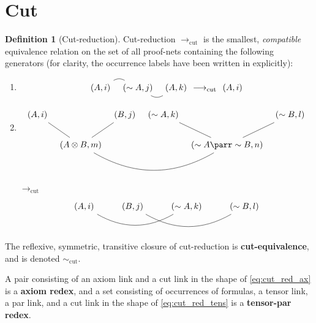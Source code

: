 \documentclass[12pt]{article}
\theoremstyle{plain}
\theoremstyle{definition}
\newtheorem{defn}[thm]{Definition} %
\newcommand{\lto}{\longrightarrow}
\newcommand{\negation}{\sim}
\begin{document}
\section{Cut}
\begin{defn}[Cut-reduction]
Cut-reduction $\lto_{\operatorname{cut}}$ is the smallest, \emph{compatible} equivalence relation on the set of all proof-nets containing the following generators (for clarity, the occurrence labels have been written in explicitly):
\begin{enumerate}
    \item \begin{equation}\label{eq:cut_red_ax}
    \begin{tikzcd}[column sep = tiny]
        (A,i)\arrow[r,dash, bend left] & (\negation A,j)\arrow[r,dash, bend right] & (A,k)
    \end{tikzcd}
    \lto_{\operatorname{cut}}
    \begin{tikzcd}
        (A,i)
    \end{tikzcd}
\end{equation}
    \item \begin{equation}\label{eq:cut_red_tens}
        \begin{tikzcd}[column sep = tiny]
            (A,i)\arrow[dr,dash] && (B,j)\arrow[dl,dash] & (\negation A, k)\arrow[dr,dash] && (\negation B, l)\arrow[dl,dash]\\
            & (A \otimes B, m)\arrow[rrr,dash, bend right] & & & (\negation A \parr \negation B, n)
        \end{tikzcd}
    \end{equation}
    $\lto_{\operatorname{cut}}$
    \begin{equation}
    \begin{tikzcd}
        (A,i)\arrow[rr,dash,bend right] & (B,j)\arrow[rr,dash,bend right] & (\negation A, k) & (\negation B, l)
        \end{tikzcd}
    \end{equation}
\end{enumerate}
The reflexive, symmetric, transitive closure of cut-reduction is \textbf{cut-equivalence}, and is denoted $\sim_{\operatorname{cut}}$.

A pair consisting of an axiom link and a cut link in the shape of \eqref{eq:cut_red_ax} is a \textbf{axiom redex}, and a set consisting of occurrences of formulas, a tensor link, a par link, and a cut link in the shape of \eqref{eq:cut_red_tens} is a \textbf{tensor-par redex}.
\end{defn}
\end{document}
